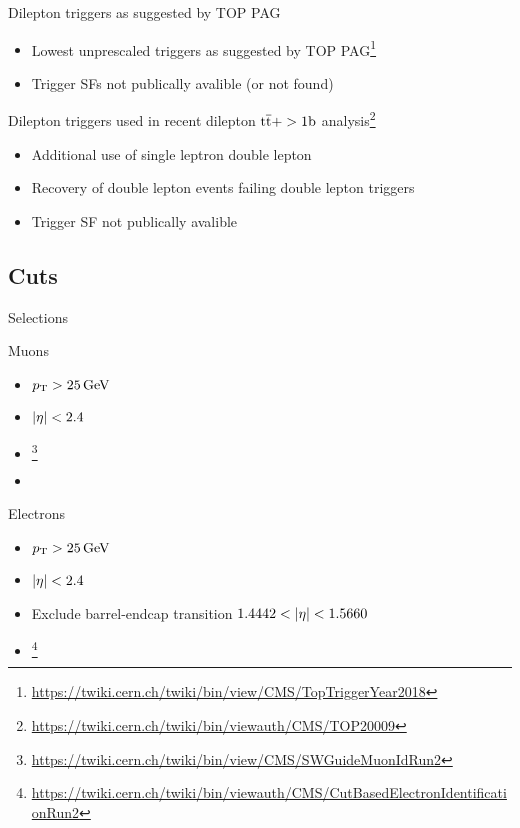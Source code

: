 \documentclass[18pt]{beamer}
\begin{document}
\begin{frame}{Dilepton triggers as suggested by TOP PAG}
	\begin{itemize}
		\item Lowest unprescaled triggers as suggested by TOP PAG\footnote{\url{https://twiki.cern.ch/twiki/bin/view/CMS/TopTriggerYear2018}}
		\item Trigger SFs not publically avalible (or not found)
	\end{itemize}
	
\end{frame}

\begin{frame}{Dilepton triggers used in recent dilepton $\text{t}\overline{\text{t}}+>1\text{b}$ analysis\footnote{\url{https://twiki.cern.ch/twiki/bin/viewauth/CMS/TOP20009}}}
	\begin{itemize}
		\item Additional use of single leptron double lepton
		\item Recovery of double lepton events failing double lepton triggers
		\item Trigger SF not publically avalible
	\end{itemize}
	
\end{frame}

\subsection{Cuts}
\begin{frame}{Selections}

	\begin{multicols}{2}
		Muons
		\begin{itemize}
			\item $p_{\text{T}}>\SI{25}{\giga\electronvolt}$
			\item $|\eta|<2.4$
			\item {}\footnote{\url{https://twiki.cern.ch/twiki/bin/view/CMS/SWGuideMuonIdRun2}}
			\item {}
		\end{itemize}
		\vfill\null
		\columnbreak
		Electrons
		\begin{itemize}
			\item $p_{\text{T}}>\SI{25}{\giga\electronvolt}$
			\item $|\eta|<2.4$
			\item Exclude barrel-endcap transition $1.4442<\abs{\eta}<1.5660$
			\item {}\footnote{\url{https://twiki.cern.ch/twiki/bin/viewauth/CMS/CutBasedElectronIdentificationRun2}}
		\end{itemize}	
	\end{multicols}

\end{frame}
\end{document}
